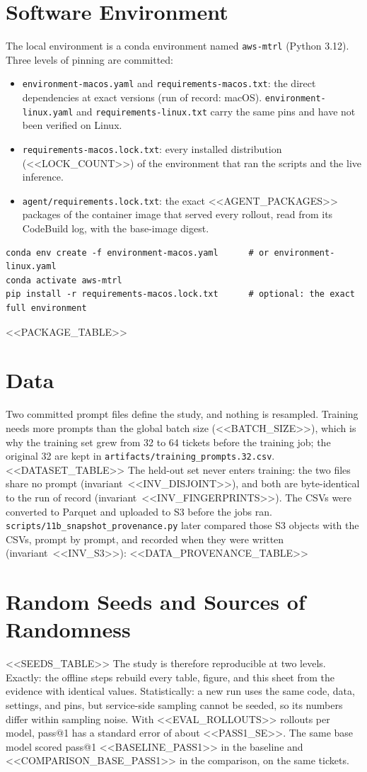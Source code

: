 \documentclass[11pt]{article}
\begin{document}
\section{Software Environment}
The local environment is a conda environment named \texttt{aws-mtrl} (Python 3.12). Three levels of pinning
are committed:
\begin{itemize}[leftmargin=*]
\item \texttt{environment-macos.yaml} and \texttt{requirements-macos.txt}: the direct dependencies at exact
versions (run of record: macOS). \texttt{environment-linux.yaml} and \texttt{requirements-linux.txt} carry the
same pins and have not been verified on Linux.
\item \texttt{requirements-macos.lock.txt}: every installed distribution (<<LOCK_COUNT>>) of the environment
that ran the scripts and the live inference.
\item \texttt{agent/requirements.lock.txt}: the exact <<AGENT_PACKAGES>> packages of the container image that
served every rollout, read from its CodeBuild log, with the base-image digest.
\end{itemize}
\begin{Verbatim}[frame=single,fontsize=\small]
conda env create -f environment-macos.yaml      # or environment-linux.yaml
conda activate aws-mtrl
pip install -r requirements-macos.lock.txt      # optional: the exact full environment
\end{Verbatim}
<<PACKAGE_TABLE>>

\section{Data}
Two committed prompt files define the study, and nothing is resampled. Training needs more prompts than the
global batch size (<<BATCH_SIZE>>), which is why the training set grew from 32 to 64 tickets before the
training job; the original 32 are kept in \texttt{artifacts/training\_prompts.32.csv}.
<<DATASET_TABLE>>
The held-out set never enters training: the two files share no prompt (invariant~<<INV_DISJOINT>>), and both
are byte-identical to the run of record (invariant~<<INV_FINGERPRINTS>>). The CSVs were converted to Parquet
and uploaded to S3 before the jobs ran. \texttt{scripts/11b\_snapshot\_provenance.py} later compared those S3
objects with the CSVs, prompt by prompt, and recorded when they were written
(invariant~<<INV_S3>>):
<<DATA_PROVENANCE_TABLE>>

\section{Random Seeds and Sources of Randomness}
<<SEEDS_TABLE>>
The study is therefore reproducible at two levels. Exactly: the offline steps rebuild every table, figure,
and this sheet from the evidence with identical values. Statistically: a new run uses the same code, data,
settings, and pins, but service-side sampling cannot be seeded, so its numbers differ within sampling noise.
With <<EVAL_ROLLOUTS>> rollouts per model, pass@1 has a standard error of about <<PASS1_SE>>. The same base
model scored pass@1 <<BASELINE_PASS1>> in the baseline and <<COMPARISON_BASE_PASS1>> in the comparison, on
the same tickets.
\end{document}
